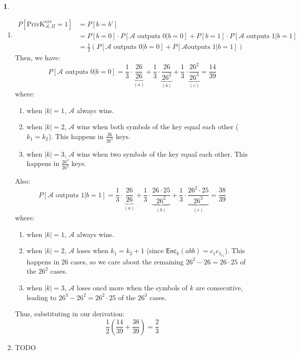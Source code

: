 \documentclass{article}
\theoremstyle{definition}
\newcommand{\abs}[1]{\left|#1\right|}
\newcommand{\Enc}{\mathsf{Enc}}
\newcommand{\Adv}{\mathcal{A}} %
\newcommand{\priveav}{\text{PrivK}_{\mathcal{A},\Pi}^\text{eav}}
\theoremstyle{definition}
\theoremstyle{definition}
\newtheorem{solution-internal}{}[subsection]
\newenvironment{solution}{
  \begin{solution-internal}
}{
  \end{solution-internal}
}
\begin{document}
\begin{solution}
  $ $
  \begin{enumerate}[label=\alph*.]
    \item \begin{align*}
    P[\priveav = 1] &= P[b=b'] \\
                    &= P[b=0] \cdot P[\text{$\Adv$ outputs 0} | b = 0] + P[b=1]
    \cdot P[\text{$\Adv$ outputs 1} | b=1] \\
    &= \frac{1}{2} \left( P[\text{$\Adv$ outputs 0}|b=0] + P[\text{$\Adv$
outputs 1}|b=1]\right)
  \end{align*}
  Then, we have:
  \[
    P[\text{$\Adv$ outputs 0} | b = 0] =
    \frac{1}{3}\cdot\underbrace{\frac{26}{26}}_{(a)} +
    \frac{1}{3}\cdot\underbrace{\frac{26}{26^2}}_{(b)} + \frac{1}{3}\cdot
    \underbrace{\frac{26^2}{26^3}}_{(c)} =
    \frac{14}{39}
\]
  where:
  \begin{enumerate}[label=\alph*.]
    \item when $\abs{k} = 1$, $\Adv$ always wins.
    \item when $\abs{k} = 2$, $\Adv$ wins when both symbols of the key equal
      each other ($k_1 = k_2$). This happens in $\frac{26}{26^2}$ keys.
    \item when $\abs{k} = 3$, $\Adv$ wins when two symbols of the key equal
      each other. This happens in $\frac{26^2}{26^3}$ keys.
  \end{enumerate}
  Also:
  \[
    P[\text{$\Adv$ outputs 1} | b = 1] =
    \frac{1}{3}\cdot\underbrace{\frac{26}{26}}_{(a)} +
    \frac{1}{3}\cdot\underbrace{\frac{26\cdot 25}{26^2}}_{(b)} + \frac{1}{3}\cdot
    \underbrace{\frac{26^2 \cdot 25}{26^3}}_{(c)} = \frac{38}{39}
\]
  where:
  \begin{enumerate}[label=\alph*.]
    \item when $\abs{k} = 1$, $\Adv$ always wins.
    \item when $\abs{k} = 2$, $\Adv$ loses when $k_1 = k_2 + 1$ (since
      $\Enc_k(abb) = c_1c_1_c_3$). This happens in 26 cases, so we care about
      the remaining $26^2-26 = 26\cdot 25$ of the $26^2$ cases.
    \item when $\abs{k} = 3$, $\Adv$ loses oncd more when the symbols of $k$ are
      consecutive, leading to $26^3-26^2 = 26^2\cdot 25$ of the $26^3$ cases.
  \end{enumerate}
  Thus, substituting in our derivation:
  \[ \frac{1}{2}\left( \frac{14}{39} + \frac{38}{39} \right) = \frac{2}{3}\]

\item TODO
\end{enumerate}
\end{solution}
\end{document}
